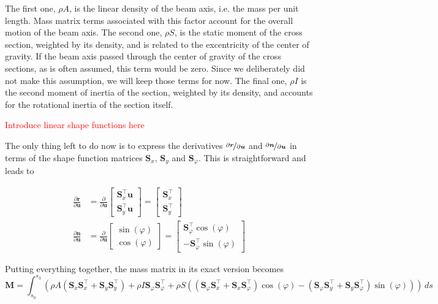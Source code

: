 The first one, $\rho A$, is the linear density of the beam axis, i.e. the mass per unit length.
Mass matrix terms associated with this factor account for the overall motion of the beam axis.
The second one, $\rho S$, is the static moment of the cross section, weighted by its density, and is related to the excentricity of the center of gravity.
If the beam axis passed through the center of gravity of the cross sections, as is often assumed, this term would be zero.
Since we deliberately did not make this assumption, we will keep those terms for now.
The final one, $\rho I$ is the second moment of inertia of the section, weighted by its density, and accounts for the rotational inertia of the section itself.

\textcolor{red}{Introduce linear shape functions here}

The only thing left to do now is to express the derivatives $\nicefrac{\partial\boldsymbol{r}}{\partial\boldsymbol{u}}$ and $\nicefrac{\partial\boldsymbol{n}}{\partial\boldsymbol{u}}$ in terms of the shape function matrices $\boldsymbol{S}_x$, $\boldsymbol{S}_y$ and $\boldsymbol{S}_\varphi$.
This is straightforward and leads to

\begin{align}
\frac{\partial\boldsymbol{r}}{\partial\boldsymbol{u}}
&=
\frac{\partial}{\partial\boldsymbol{u}}
\begin{bmatrix}
\boldsymbol{S}_x^\intercal\boldsymbol{u} \\ \boldsymbol{S}_y^\intercal\boldsymbol{u}
\end{bmatrix}
=
\begin{bmatrix}
\boldsymbol{S}_x^\intercal \\ \boldsymbol{S}_y^\intercal
\end{bmatrix}
\\
\frac{\partial\boldsymbol{n}}{\partial\boldsymbol{u}}
&=
\frac{\partial}{\partial\boldsymbol{u}}
\begin{bmatrix}
\sin(\varphi) \\ \cos(\varphi)
\end{bmatrix}
=
\begin{bmatrix}
\boldsymbol{S}_\varphi^\intercal\cos(\varphi) \\ -\boldsymbol{S}_\varphi^\intercal\sin(\varphi)
\end{bmatrix}
\end{align}

Putting everything together, the mass matrix in its exact version becomes
%
\begin{equation}
\boldsymbol{M} = \int_{s_0}^{s_3} \left(\rho A\left(\boldsymbol{S}_x\boldsymbol{S}_x^\intercal + \boldsymbol{S}_y\boldsymbol{S}_y^\intercal\right) + \rho I\boldsymbol{S}_\varphi\boldsymbol{S}_\varphi^\intercal + \rho S\left(\left(\boldsymbol{S}_\varphi\boldsymbol{S}_x^\intercal + \boldsymbol{S}_x\boldsymbol{S}_\varphi^\intercal\right)\cos(\varphi) - \left(\boldsymbol{S}_\varphi\boldsymbol{S}_y^\intercal + \boldsymbol{S}_y\boldsymbol{S}_\varphi^\intercal\right)\sin(\varphi)\right)\right)\,ds
\end{equation}

